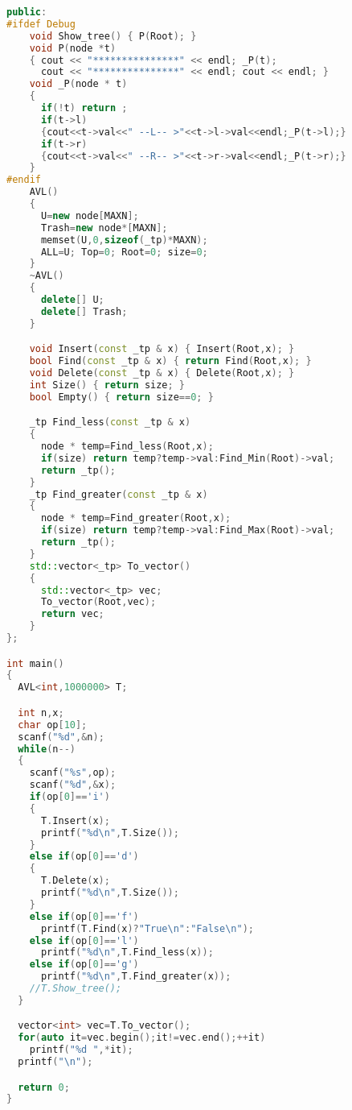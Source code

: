 \documentclass[UTF8]{report}
\numberwithin{figure}{subsection}
\numberwithin{table}{subsection}
\begin{document}
\begin{lstlisting}[language=c++]
  public:
#ifdef Debug
    void Show_tree() { P(Root); }
    void P(node *t)
    { cout << "***************" << endl; _P(t);
      cout << "***************" << endl; cout << endl; }
    void _P(node * t)
    {
      if(!t) return ;
      if(t->l)
      {cout<<t->val<<" --L-- >"<<t->l->val<<endl;_P(t->l);}
      if(t->r)
      {cout<<t->val<<" --R-- >"<<t->r->val<<endl;_P(t->r);}
    }
#endif
    AVL()
    {
      U=new node[MAXN];
      Trash=new node*[MAXN];
      memset(U,0,sizeof(_tp)*MAXN);
      ALL=U; Top=0; Root=0; size=0;
    }
    ~AVL()
    {
      delete[] U;
      delete[] Trash;
    }

    void Insert(const _tp & x) { Insert(Root,x); }
    bool Find(const _tp & x) { return Find(Root,x); }
    void Delete(const _tp & x) { Delete(Root,x); }
    int Size() { return size; }
    bool Empty() { return size==0; }

    _tp Find_less(const _tp & x)
    {
      node * temp=Find_less(Root,x);
      if(size) return temp?temp->val:Find_Min(Root)->val;
      return _tp();
    }
    _tp Find_greater(const _tp & x)
    {
      node * temp=Find_greater(Root,x);
      if(size) return temp?temp->val:Find_Max(Root)->val;
      return _tp();
    }
    std::vector<_tp> To_vector()
    {
      std::vector<_tp> vec;
      To_vector(Root,vec);
      return vec;
    }
};

int main()
{
  AVL<int,1000000> T;

  int n,x;
  char op[10];
  scanf("%d",&n);
  while(n--)
  {
    scanf("%s",op);
    scanf("%d",&x);
    if(op[0]=='i')
    {
      T.Insert(x);
      printf("%d\n",T.Size());
    }
    else if(op[0]=='d')
    {
      T.Delete(x);
      printf("%d\n",T.Size());
    }
    else if(op[0]=='f')
      printf(T.Find(x)?"True\n":"False\n");
    else if(op[0]=='l')
      printf("%d\n",T.Find_less(x));
    else if(op[0]=='g')
      printf("%d\n",T.Find_greater(x));
    //T.Show_tree();
  }

  vector<int> vec=T.To_vector();
  for(auto it=vec.begin();it!=vec.end();++it)
    printf("%d ",*it);
  printf("\n");

  return 0;
}
\end{lstlisting}
\end{document}
